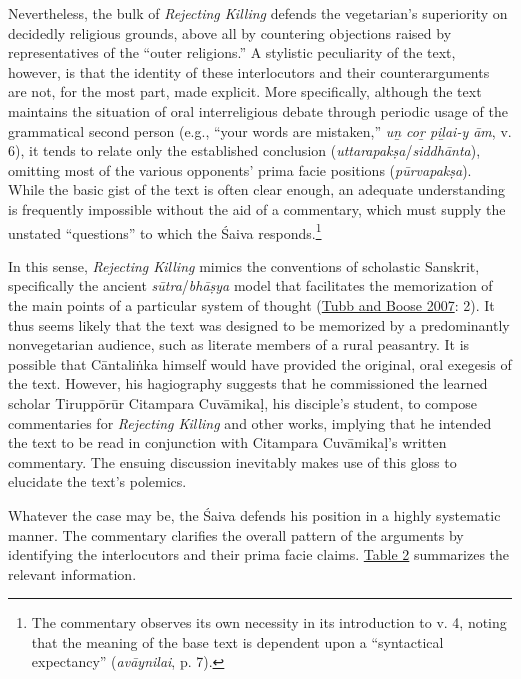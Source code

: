 Nevertheless, the bulk of \emph{Rejecting Killing} defends the vegetarian’s superiority on decidedly religious grounds, above all by countering objections raised by representatives of the “outer religions.” A stylistic peculiarity of the text, however, is that the identity of these interlocutors and their counterarguments are not, for the most part, made explicit. More specifically, although the text maintains the situation of oral interreligious debate through periodic usage of the grammatical second person (e.g., “your words are mistaken,” \emph{uṉ coṟ piḻai-y ām}, v. 6), it tends to relate only the established conclusion (\emph{uttarapakṣa}/\emph{siddhānta}), omitting most of the various opponents’ prima facie positions (\emph{pūrvapakṣa}). While the basic gist of the text is often clear enough, an adequate understanding is frequently impossible without the aid of a commentary, which must supply the unstated “questions” to which the Śaiva responds.\footnote{%
The commentary observes its own necessity in its introduction to v. 4, noting that the meaning of the base text is dependent upon a “syntactical expectancy” (\emph{avāynilai}, p. 7).
}



In this sense, \emph{Rejecting Killing }mimics the conventions of scholastic Sanskrit, specifically the ancient \emph{sūtra}/\emph{bhāṣya} model that facilitates the memorization of the main points of a particular system of thought (\hyperref[Tubb2007]{Tubb and Boose 2007}: 2). It thus seems likely that the text was designed to be memorized by a predominantly nonvegetarian audience, such as literate members of a rural peasantry. It is possible that Cāntaliṅka himself would have provided the original, oral exegesis of the text. However, his hagiography suggests that he commissioned the learned scholar Tiruppōrūr Citampara Cuvāmikaḷ, his disciple’s student, to compose commentaries for \emph{Rejecting Killing} and other works, implying that he intended the text to be read in conjunction with Citampara Cuvāmikaḷ’s written commentary. The ensuing discussion inevitably makes use of this gloss to elucidate the text’s polemics. 


Whatever the case may be, the Śaiva defends his position in a highly systematic manner. The commentary clarifies the overall pattern of the arguments by identifying the interlocutors and their prima facie claims. \hyperref[tab2]{Table 2} summarizes the relevant information.


